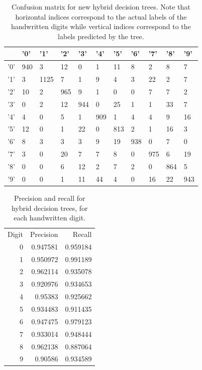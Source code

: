 \begin{table}
	\begin{tabular}{l|llllllllll}
		&   '0' &   '1' &   '2' &   '3' &   '4' &   '5' &   '6' &   '7' &   '8' &   '9' \\
		\hline
		'0' &   940 &     3 &    12 &     0 &     1 &    11 &     8 &     2 &     8 &     7 \\
		'1' &     3 &  1125 &     7 &     1 &     9 &     4 &     3 &    22 &     2 &     7 \\
		'2' &    10 &     2 &   965 &     9 &     1 &     0 &     0 &     7 &     7 &     2 \\
		'3' &     0 &     2 &    12 &   944 &     0 &    25 &     1 &     1 &    33 &     7 \\
		'4' &     4 &     0 &     5 &     1 &   909 &     1 &     4 &     4 &     9 &    16 \\
		'5' &    12 &     0 &     1 &    22 &     0 &   813 &     2 &     1 &    16 &     3 \\
		'6' &     8 &     3 &     3 &     3 &     9 &    19 &   938 &     0 &     7 &     0 \\
		'7' &     3 &     0 &    20 &     7 &     7 &     8 &     0 &   975 &     6 &    19 \\
		'8' &     0 &     0 &     6 &    12 &     2 &     7 &     2 &     0 &   864 &     5 \\
		'9' &     0 &     0 &     1 &    11 &    44 &     4 &     0 &    16 &    22 &   943 \\
	\end{tabular}
	\caption{Confusion matrix for new hybrid decision trees.  Note that horizontal indices correspond to the actual labels of the handwritten digits while vertical indices correspond to the labels predicted by the tree.}
	\label{table:with_kd_confusion}
\end{table}

\begin{table}
	\centering
	\begin{tabular}{rrr}
		\hline
		Digit &   Precision &   Recall \\
		0 &    0.947581 & 0.959184 \\
		1 &    0.950972 & 0.991189 \\
		2 &    0.962114 & 0.935078 \\
		3 &    0.920976 & 0.934653 \\
		4 &    0.95383  & 0.925662 \\
		5 &    0.934483 & 0.911435 \\
		6 &    0.947475 & 0.979123 \\
		7 &    0.933014 & 0.948444 \\
		8 &    0.962138 & 0.887064 \\
		9 &    0.90586  & 0.934589 \\
	\end{tabular}
	\caption{Precision and recall for hybrid decision trees, for each handwritten digit.}
	\label{table:with_kd_precision_recall}
\end{table}

